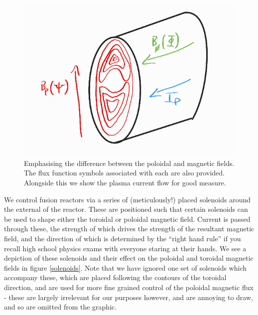 \begin{figure}
    \centering
    \includegraphics[scale=2.0]{imgs/c1/flux-functions.png}
    \caption{Emphasising the difference between the poloidal and magnetic fields. The flux function symbols associated with each are 
    also provided. Alongside this we show the plasma current flow for good measure.}
    \label{flux-functions}
\end{figure}

We control fusion reactors via a series of (meticulously!) placed solenoids around the external of the reactor. These are positioned 
such that certain solenoids can be used to shape either the toroidal or poloidal magnetic field. Current is passed through these,
the strength of which drives the strength of the resultant magnetic field, and the direction of which is determined by the 
``right hand rule'' if you recall high school physics exams with everyone staring at their hands. We see a depiction of these solenoids 
and their effect on the poloidal and toroidal magnetic fields in figure \ref{solenoids}. Note that we have ignored one set of solenoids which accompany these, which are placed 
following the contours of the toroidal direction, and are used for more fine grained control of the poloidal magnetic flux - these are 
largely irrelevant for our purposes however, and are annoying to draw, and so are omitted from the graphic.

